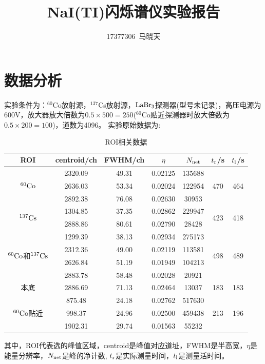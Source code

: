 \documentclass[UTF8]{ctexart}
\title{NaI(TI)闪烁谱仪实验报告}
\author{17377306\ 马晓天}
\begin{document}
\maketitle

\thispagestyle{empty}
\section{数据分析}
实验条件为：$^{60}$Co放射源，$^{137}$Cs放射源，$ \rm LaBr_{3} $探测器(型号未记录)，高压电源为600V，放大器放大倍数为$ 0.5\times500=250 $($^{60}$Co贴近探测器时放大倍数为$ 0.5\times200=100 $)，道数为4096。
实验原始数据为:
\begin{table}[H]
	\centering
	\caption{ROI相关数据}
	\begin{tabular}{ccccccc}
		\hline
		ROI & centroid/ch & FWHM/ch & $ \eta $ & $ N_{\rm net} $ & $ t_{\rm r} $/s &$ t_{\rm l} $/s\\
		\hline
		\multirow{3}[0]{*}{$\rm ^{60}Co$} & 2320.09 & 49.31 & 0.02125 & 135688 &&\\
		 & 2636.03 & 53.34 & 0.02024 & 122954 &470&464\\
		 & 2892.38 & 76.08 & 0.02630 & 30953 &&\\
		\hline
		\multirow{2}[0]{*}{$\rm ^{137}Cs$} & 1304.85 & 37.35 & 0.02862 & 229947 &\multirow{2}[0]{*}{423}&\multirow{2}[0]{*}{418}\\
		 & 2888.86 & 80.61 & 0.02790 & 28428 &&\\
		\hline
		 & 1299.39 & 38.13 & 0.02934 & 275173 &&\\
		\multirow{2}[0]{*}{$\rm ^{60}Co$和$\rm  ^{137}Cs $} & 2312.36 & 49.00 & 0.02119 & 113581 &\multirow{2}[0]{*}{498}&\multirow{2}[0]{*}{489}\\
		 & 2626.84 & 51.19 & 0.01949 & 104213 &&\\
		& 2883.78 & 58.48 & 0.02028 & 20921 &&\\
		\hline
		本底 & 2886.69 & 71.13 & 0.02464 & 13037 & 183 &183\\
		\hline
		 & 875.48 & 24.18 & 0.02762 & 517630 &&\\
		$\rm ^{60}Co$贴近 & 998.37 & 24.96 & 0.02500 & 459438 &213&196\\
		 & 1902.31 & 29.74 & 0.01563 & 55232 &&\\
		\hline
	\end{tabular}
\end{table}
其中，ROI代表选的峰值区域，centroid是峰值对应道址，FWHM是半高宽，$ \eta $是能量分辨率，$ N_{\rm net} $是峰的净计数, $ t_{\rm r} $是实际测量时间，$ t_{\rm l} $是测量活时间。
\end{document}
